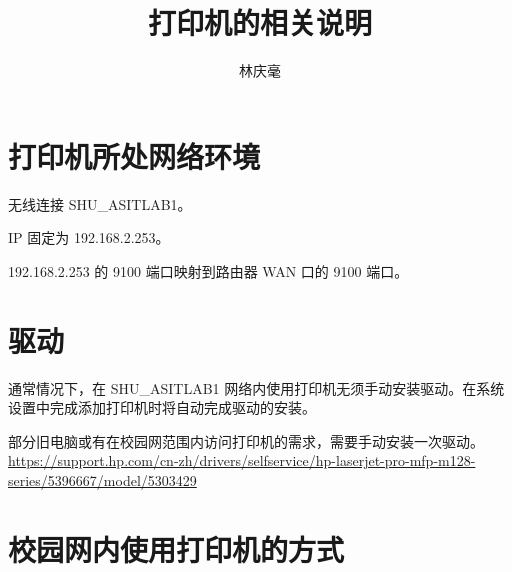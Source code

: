 \documentclass{article}
\begin{document}
\author{林庆毫}
\title{打印机的相关说明}
\maketitle
\tableofcontents
\newpage
{}

\section{打印机所处网络环境}
无线连接 SHU\_ASITLAB1。

IP 固定为 192.168.2.253。

192.168.2.253 的 9100 端口映射到路由器 WAN 口的 9100 端口。

\section{驱动}
通常情况下，在 SHU\_ASITLAB1 网络内使用打印机无须手动安装驱动。在系统设置中完成添加打印机时将自动完成驱动的安装。

部分旧电脑或有在校园网范围内访问打印机的需求，需要手动安装一次驱动。
\url{https://support.hp.com/cn-zh/drivers/selfservice/hp-laserjet-pro-mfp-m128-series/5396667/model/5303429}

\section{校园网内使用打印机的方式}
\end{document}
